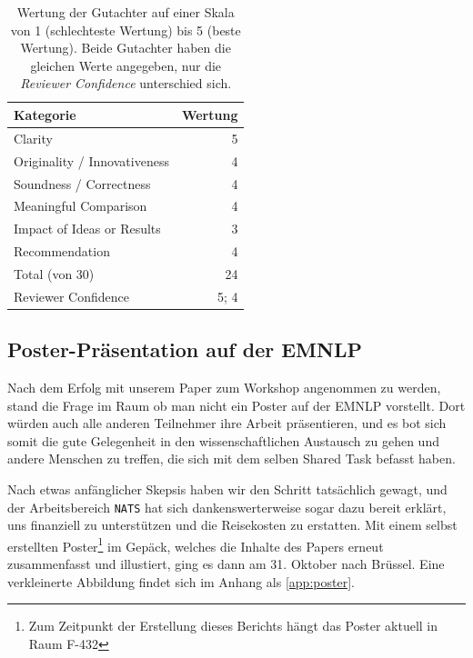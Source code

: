 \documentclass[11pt,a4paper]{article}
\begin{document}
\begin{table}
\centering
\begin{tabularx}{\linewidth}{Xr}
\toprule
\textbf{Kategorie}            & \textbf{Wertung}  \\
\midrule
Clarity                      & 5            \\
Originality / Innovativeness & 4             \\
Soundness / Correctness      & 4            \\
Meaningful Comparison        & 4             \\
Impact of Ideas or Results   & 3              \\
Recommendation               & 4             \\
\midrule
Total (von 30)               & 24             \\
\midrule
Reviewer Confidence          & 5; 4          \\
\bottomrule
\end{tabularx}
\caption{Wertung der Gutachter auf einer Skala von 1 (schlechteste Wertung) bis 5 (beste Wertung). Beide Gutachter haben die gleichen Werte angegeben, nur die \textit{Reviewer Confidence} unterschied sich.}
\label{tab:review}
\end{table}

\subsection{Poster-Präsentation auf der EMNLP}
\label{sec:paper:emnlp}

Nach dem Erfolg mit unserem Paper zum Workshop angenommen zu werden, stand die Frage im Raum ob man nicht ein Poster auf der EMNLP vorstellt. Dort würden auch alle anderen Teilnehmer ihre Arbeit präsentieren, und es bot sich somit die gute Gelegenheit in den wissenschaftlichen Austausch zu gehen und andere Menschen zu treffen, die sich mit dem selben Shared Task befasst haben.

Nach etwas anfänglicher Skepsis haben wir den Schritt tatsächlich gewagt, und der Arbeitsbereich \texttt{NATS} hat sich dankenswerterweise sogar dazu bereit erklärt, uns finanziell zu unterstützen und die Reisekosten zu erstatten. Mit einem selbst erstellten Poster\footnote{Zum Zeitpunkt der Erstellung dieses Berichts hängt das Poster aktuell in Raum F-432} im Gepäck, welches die Inhalte des Papers erneut zusammenfasst und illustiert, ging es dann am 31. Oktober nach Brüssel. Eine verkleinerte Abbildung findet sich im Anhang als \autoref{app:poster}.
\end{document}
